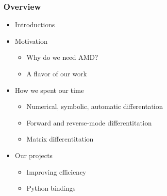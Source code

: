 

\begin{frame}
\frametitle{Overview}
%
\begin{itemize}
\item Introductions
\item Motivation
  \begin{itemize}
  \item Why do we need AMD?
  \item A flavor of our work
  \end{itemize}
\item How we spent our time
  \begin{itemize}
    \item Numerical, symbolic, automatic differentation
    \item Forward and reverse-mode differentitation
    \item Matrix differentitation
  \end{itemize}
\item Our projects
  \begin{itemize}
  \item Improving efficiency
  \item Python bindings
  \end{itemize}
\end{itemize}
%
\end{frame}










